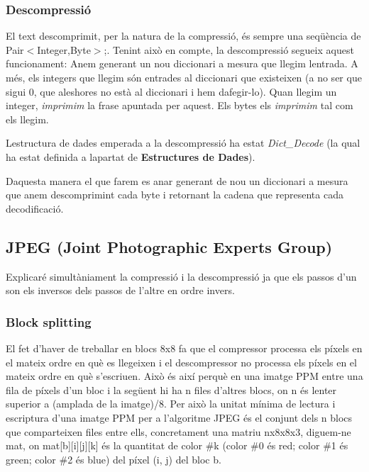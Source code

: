 \subsubsection*{Descompressió}

El text descomprimit, per la natura de la compressió, és sempre una seqüència de Pair$<$\+Integer,\+Byte$>$;. Tenint això en compte, la descompressió segueix aquest funcionament\+: Anem generant un nou diccionari a mesura que llegim l\textquotesingle{}entrada. A més, els integers que llegim són entrades al diccionari que existeixen (a no ser que sigui 0, que aleshores no està al diccionari i hem d\textquotesingle{}afegir-\/lo). Quan llegim un integer, {\itshape imprimim} la frase apuntada per aquest. Els bytes els {\itshape imprimim} tal com els llegim.

L\textquotesingle{}estructura de dades emperada a la descompressió ha estat {\itshape Dict\+\_\+\+Decode} (la qual ha estat definida a l\textquotesingle{}apartat de {\bfseries Estructures de Dades}).

D\textquotesingle{}aquesta manera el que farem es anar generant de nou un diccionari a mesura que anem descomprimint cada byte i retornant la cadena que representa cada decodificació.

\subsection*{J\+P\+EG (Joint Photographic Experts Group)}

Explicaré simultàniament la compressió i la descompressió ja que els passos d’un son els inversos dels passos de l’altre en ordre invers.

\subsubsection*{Block splitting}

El fet d’haver de treballar en blocs 8x8 fa que el compressor processa els píxels en el mateix ordre en què es llegeixen i el descompressor no processa els píxels en el mateix ordre en què s’escriuen. Això és així perquè en una imatge P\+PM entre una fila de píxels d’un bloc i la següent hi ha n files d’altres blocs, on n és l\textquotesingle{}enter superior a (amplada de la imatge)/8. Per això la unitat mínima de lectura i escriptura d’una imatge P\+PM per a l’algoritme J\+P\+EG és el conjunt dels n blocs que comparteixen files entre ells, concretament una matriu nx8x8x3, diguem-\/ne mat, on mat\mbox{[}b\mbox{]}\mbox{[}i\mbox{]}\mbox{[}j\mbox{]}\mbox{[}k\mbox{]} és la quantitat de color \#k (color \#0 és red; color \#1 és green; color \#2 és blue) del píxel (i, j) del bloc b.

